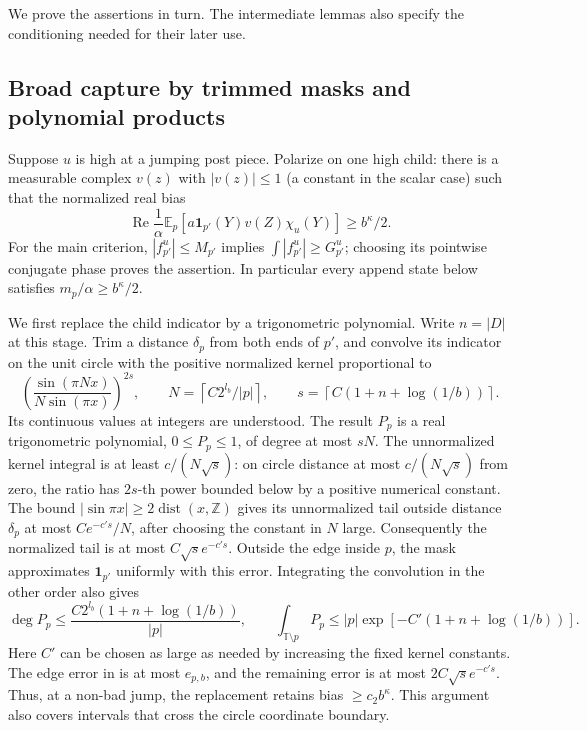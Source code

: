 We prove the assertions in turn. The intermediate lemmas also specify the
conditioning needed for their later use.

\subsection{Broad capture by trimmed masks and polynomial products}

Suppose $u$ is high at a jumping post piece. Polarize on one high child:
there is a measurable complex $v(z)$ with $|v(z)|\le1$ (a constant in the
scalar case) such that the normalized real bias
\begin{equation}\label{eq:07-polarized-bias}
 \operatorname{Re}\frac1\alpha\mathbb E_p
       [a\mathbf1_{p'}(Y)v(Z)\chi_u(Y)]\ge b^\kappa/2.
\end{equation}
For the main criterion, $|f_{p'}^u|\le M_{p'}$ implies
$\int|f_{p'}^u|\ge G_{p'}^u$; choosing its pointwise conjugate phase proves
the assertion. In particular every append state below satisfies
$m_p/\alpha\ge b^\kappa/2$.

We first replace the child indicator by a trigonometric polynomial. Write
$n=|D|$ at this stage. Trim a distance $\delta_p$ from both ends of $p'$,
and convolve its indicator on the unit circle with the positive normalized
kernel proportional to
\[
 \left(\frac{\sin(\pi N x)}{N\sin(\pi x)}\right)^{2s},
 \qquad
 N=\left\lceil C2^{l_b}/|p|\right\rceil,
 \qquad
 s=\left\lceil C(1+n+\log(1/b))\right\rceil.
\]
Its continuous values at integers are understood. The result $P_p$ is a
real trigonometric polynomial, $0\le P_p\le1$, of degree at most $sN$.
The unnormalized kernel integral is at least $c/(N\sqrt{s})$: on circle
distance at most $c/(N\sqrt{s})$ from zero, the ratio has $2s$-th power
bounded below by a positive numerical constant. The bound
$|\sin\pi x|\ge2\operatorname{dist}(x,\mathbb Z)$ gives its unnormalized
tail outside distance $\delta_p$ at most $Ce^{-c's}/N$, after choosing the
constant in $N$ large. Consequently the normalized tail is at most
$C\sqrt{s}e^{-c's}$. Outside the edge inside $p$, the mask approximates
$\mathbf1_{p'}$ uniformly with this error. Integrating the convolution in
the other order also gives
\begin{equation}\label{eq:07-mask-bounds}
 \deg P_p\le \frac{C2^{l_b}(1+n+\log(1/b))}{|p|},
 \qquad
 \int_{\mathbb T\setminus p}P_p
 \le |p|\exp[-C'(1+n+\log(1/b))].
\end{equation}
Here $C'$ can be chosen as large as needed by increasing the fixed kernel
constants. The edge error in  is at most
$e_{p,b}$, and the remaining error is at most
$2C\sqrt{s}e^{-c's}$. Thus, at a non-bad jump, the replacement retains bias
$\ge c_2b^\kappa$. This argument also covers intervals that cross the
circle coordinate boundary.

